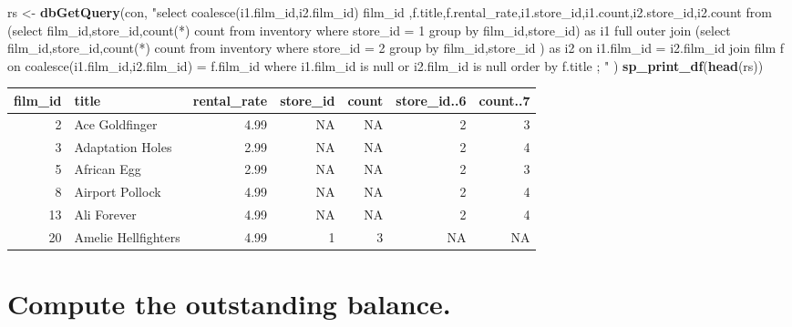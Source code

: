 \documentclass[]{book}
\newenvironment{Shaded}{\begin{snugshade}}{\end{snugshade}}
\newcommand{\KeywordTok}[1]{\textcolor[rgb]{0.13,0.29,0.53}{\textbf{#1}}}
\newcommand{\NormalTok}[1]{#1}
\newcommand{\StringTok}[1]{\textcolor[rgb]{0.31,0.60,0.02}{#1}}
\theoremstyle{definition}
\theoremstyle{definition}
\theoremstyle{definition}
\theoremstyle{remark}
\begin{document}
\begin{Shaded}
\begin{Highlighting}[]
\NormalTok{rs <-}\StringTok{ }\KeywordTok{dbGetQuery}\NormalTok{(con,}
                \StringTok{"select coalesce(i1.film_id,i2.film_id) film_id}
\StringTok{                       ,f.title,f.rental_rate,i1.store_id,i1.count,i2.store_id,i2.count}
\StringTok{                   from     (select film_id,store_id,count(*) count }
\StringTok{                               from inventory where store_id = 1 }
\StringTok{                             group by film_id,store_id) as i1}
\StringTok{                         full outer join }
\StringTok{                            (select film_id,store_id,count(*) count}
\StringTok{                               from inventory where store_id = 2 }
\StringTok{                             group by film_id,store_id}
\StringTok{                            ) as i2}
\StringTok{                           on i1.film_id = i2.film_id }
\StringTok{                         join film f }
\StringTok{                           on coalesce(i1.film_id,i2.film_id) = f.film_id}
\StringTok{                  where i1.film_id is null or i2.film_id is null }
\StringTok{                 order by f.title  ;}
\StringTok{               "}
\NormalTok{                )  }
\KeywordTok{sp_print_df}\NormalTok{(}\KeywordTok{head}\NormalTok{(rs))}
\end{Highlighting}
\end{Shaded}

\begin{tabular}{r|l|r|r|r|r|r}
\hline
film\_id & title & rental\_rate & store\_id & count & store\_id..6 & count..7\\
\hline
2 & Ace Goldfinger & 4.99 & NA & NA & 2 & 3\\
\hline
3 & Adaptation Holes & 2.99 & NA & NA & 2 & 4\\
\hline
5 & African Egg & 2.99 & NA & NA & 2 & 3\\
\hline
8 & Airport Pollock & 4.99 & NA & NA & 2 & 4\\
\hline
13 & Ali Forever & 4.99 & NA & NA & 2 & 4\\
\hline
20 & Amelie Hellfighters & 4.99 & 1 & 3 & NA & NA\\
\hline
\end{tabular}

\hypertarget{compute-the-outstanding-balance.}{%
\section{Compute the outstanding
balance.}\label{compute-the-outstanding-balance.}}
\end{document}
